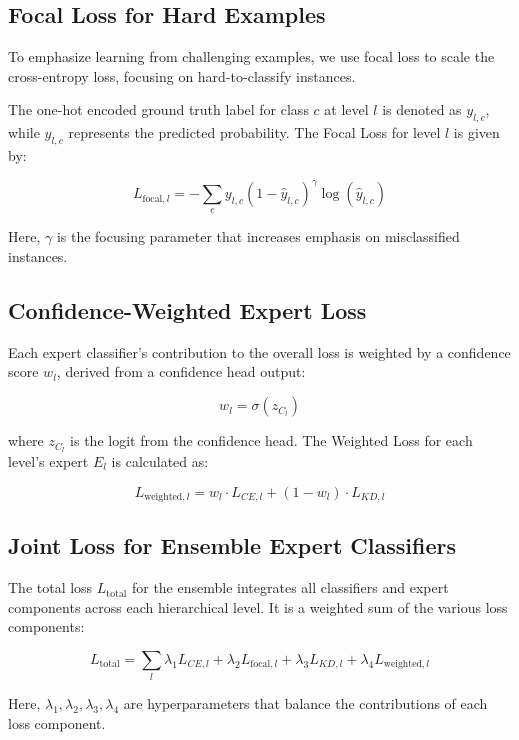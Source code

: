 \documentclass[9pt,a4paper,twoside]{rho-class/rho}
\begin{document}
 \subsection{Focal Loss for Hard Examples}
    
        To emphasize learning from challenging examples, we use focal loss to scale the cross-entropy loss, focusing on hard-to-classify instances. 

   The one-hot encoded ground truth label for class \( c \) at level \( l \) is denoted as \( y_{l,c} \), while \( \hat{y}_{l,c} \) represents the predicted probability. The Focal Loss for level \( l \) is given by:

   \[
   L_{\text{focal},l} = -\sum_{c} y_{l,c} (1 - \hat{y}_{l,c})^\gamma \log(\hat{y}_{l,c})
   \]

   Here, \( \gamma \) is the focusing parameter that increases emphasis on misclassified instances.

 \subsection{Confidence-Weighted Expert Loss}
    
         Each expert classifier’s contribution to the overall loss is weighted by a confidence score \( w_l \), derived from a confidence head output:

   \[
   w_l = \sigma(z_{C_l})
   \]

   where \( z_{C_l} \) is the logit from the confidence head. The Weighted Loss for each level’s expert \( E_l \) is calculated as:

   \[
   L_{\text{weighted},l} = w_l \cdot L_{CE,l} + (1 - w_l) \cdot L_{KD,l}
   \]
 \subsection{Joint Loss for Ensemble Expert Classifiers}
    
        The total loss \( L_{\text{total}} \) for the ensemble integrates all classifiers and expert components across each hierarchical level. It is a weighted sum of the various loss components:

   \[
   L_{\text{total}} = \sum_{l} \lambda_1 L_{CE,l} + \lambda_2 L_{\text{focal},l} + \lambda_3 L_{KD,l} + \lambda_4 L_{\text{weighted},l}
   \]

   Here, \( \lambda_1, \lambda_2, \lambda_3, \lambda_4 \) are hyperparameters that balance the contributions of each loss component.
\end{document}
